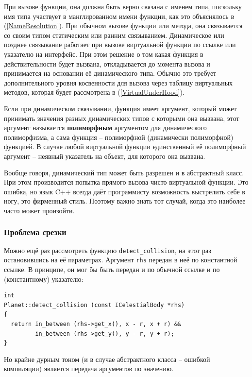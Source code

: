 \documentclass[a4paper,12pt,oneside]{article}
\begin{document}
При вызове функции, она должна быть верно связана с именем типа, поскольку имя типа участвует в манглированном имени функции, как это объяснялось в (\ref{NameResolution}). При обычном вызове функции или метода, она связывается со своим типом статическим или ранним связыванием. Динамическое или позднее связывание работает при вызове виртуальной функции по ссылке или указателю на интерфейс. При этом решение о том какая функция в действительности будет вызвана, откладывается до момента вызова и принимается на основании её динамического типа. Обычно это требует дополнительного уровня косвенности для вызова через таблицу виртуальных методов, которая будет рассмотрена в (\ref{VirtualUnderHood}).

Если при динамическом связывании, функция имеет аргумент, который может принимать значения разных динамических типов с которыми она вызвана, этот аргумент называется \textbf{полиморфным} аргументом для динамического полиморфизма, а сама функция -- полиморфной (динамически полиморфной) функцией. В случае любой виртуальной функции единственный её полиморфный аргумент -- неявный указатель на объект, для которого она вызвана.

Вообще говоря, динамический тип может быть разрешен и в абстрактный класс. При этом производится попытка прямого вызова чисто виртуальной функции. Это ошибка, но язык C++ всегда даёт программисту возможность выстрелить себе в ногу, это фирменный стиль. Поэтому важно знать тот случай, когда это наиболее часто может произойти.

\subsubsection{Проблема срезки}\label{Cutting}

Можно ещё раз рассмотреть функцию \lstinline!detect_collision!, на этот раз остановившись на её параметрах. Аргумент \lstinline!rhs! передан в неё по константной ссылке. В принципе, он мог бы быть передан и по обычной ссылке и по (константному) указателю:

\begin{lstlisting}
int 
Planet::detect_collision (const ICelestialBody *rhs)
{
  return in_between (rhs->get_x(), x - r, x + r) && 
         in_between (rhs->get_y(), y - r, y + r);
}
\end{lstlisting}

Но крайне дурным тоном (и в случае абстрактного класса -- ошибкой компиляции) является передача аргументов по значению.
\end{document}
